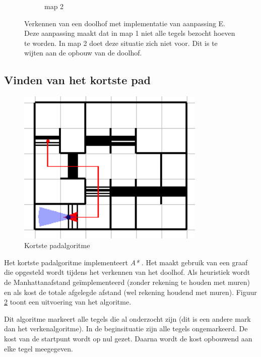 \documentclass[eind]{penoverslag}
\begin{document}
\begin{figure}
\begin{subfigure}[hb]{0.36\textwidth}
                \caption{map 2}
        \end{subfigure}
 \caption[Verkennen van een doolhof]{Verkennen van een doolhof met implementatie van aanpassing E. Deze aanpassing maakt dat in map 1 niet alle tegels bezocht hoeven te worden. In map 2 doet deze situatie zich niet voor. Dit is te wijten aan de opbouw van de doolhof.}
\label{fig:resultVerkenE}
\end{figure}

\subsection{Vinden van het kortste pad} %
\label{ssec:AlgoKortsteP}

\begin{figure}[tbp]
\begin{center}
    \includegraphics[width=0.8\textwidth]{kortstepadvisual}
    \caption{Kortste padalgoritme}
	\label{fig:kortstepad}
\end{center}
\end{figure}

Het kortste padalgoritme implementeert \textit{A*} \cite{A*}. Het maakt gebruik van een graaf die opgesteld wordt tijdens het verkennen van het doolhof. Als heuristiek wordt de Manhattanafstand \cite{manhattan} ge\"implementeerd (zonder rekening te houden met muren) en als kost de totale afgelegde afstand (wel rekening houdend met muren). Figuur \ref{fig:kortstepad} toont een uitvoering van het algoritme.

Dit algoritme markeert alle tegels die al onderzocht zijn (dit is een andere mark dan het verkenalgoritme). In de beginsituatie zijn alle tegels ongemarkeerd. De kost van de startpunt wordt op nul gezet. Daarna wordt de kost opbouwend aan elke tegel meegegeven.
\end{document}
